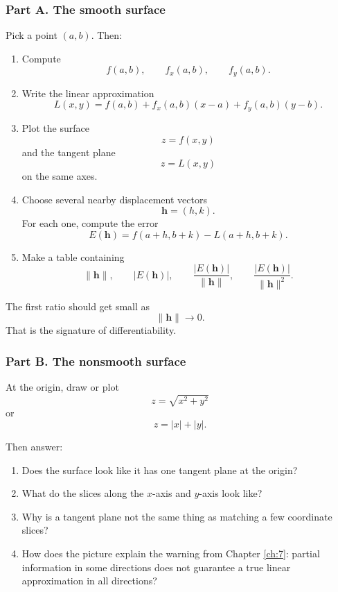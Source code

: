 \subsubsection*{Part A. The smooth surface}

Pick a point \((a,b)\).  Then:

\begin{enumerate}
\item Compute
\[
    f(a,b),\qquad f_x(a,b),\qquad f_y(a,b).
\]

\item Write the linear approximation
\[
\boxed{
    L(x,y)=f(a,b)+f_x(a,b)(x-a)+f_y(a,b)(y-b).
}
\]

\item Plot the surface
\[
    z=f(x,y)
\]
and the tangent plane
\[
    z=L(x,y)
\]
on the same axes.

\item Choose several nearby displacement vectors
\[
    \mathbf h=(h,k).
\]
For each one, compute the error
\[
    E(\mathbf h)=f(a+h,b+k)-L(a+h,b+k).
\]

\item Make a table containing
\[
    \|\mathbf h\|,
    \qquad
    |E(\mathbf h)|,
    \qquad
    \frac{|E(\mathbf h)|}{\|\mathbf h\|},
    \qquad
    \frac{|E(\mathbf h)|}{\|\mathbf h\|^2}.
\]
\end{enumerate}

The first ratio should get small as
\[
    \|\mathbf h\|\to0.
\]
That is the signature of differentiability.

\subsubsection*{Part B. The nonsmooth surface}

At the origin, draw or plot
\[
    z=\sqrt{x^2+y^2}
\]
or
\[
    z=|x|+|y|.
\]

Then answer:

\begin{enumerate}
\item Does the surface look like it has one tangent plane at the origin?

\item What do the slices along the \(x\)-axis and \(y\)-axis look like?

\item Why is a tangent plane not the same thing as matching a few coordinate slices?

\item How does the picture explain the warning from Chapter \ref{ch:7}: partial
information in some directions does not guarantee a true linear approximation in all
directions?
\end{enumerate}

